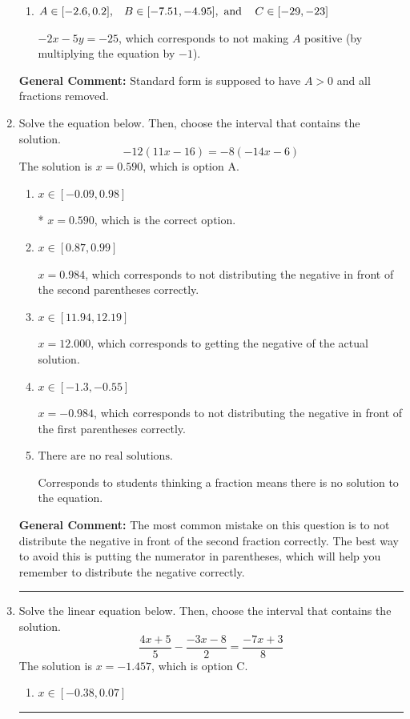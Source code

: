 \documentclass{extbook}[14pt]
\newcommand{\litem}[1]{\item #1

\rule{\textwidth}{0.4pt}}
\begin{document}
\begin{enumerate}
{\begin{enumerate}[label=\Alph*.]
* $2x + 5y = 25$, which is the correct option.
\item \( A \in [-2.6, 0.2], \hspace{3mm} B \in [-7.51, -4.95], \text{ and } \hspace{3mm} C \in [-29, -23] \)

 $-2x - 5y = -25$, which corresponds to not making $A$ positive (by multiplying the equation by $-1$).
\end{enumerate}

\textbf{General Comment:} Standard form is supposed to have $A > 0$ and all fractions removed.
}
\litem{
Solve the equation below. Then, choose the interval that contains the solution.
\[ -12(11x -16) = -8(-14x -6) \]The solution is \( x = 0.590 \), which is option A.\begin{enumerate}[label=\Alph*.]
\item \( x \in [-0.09, 0.98] \)

* $x = 0.590$, which is the correct option.
\item \( x \in [0.87, 0.99] \)

$x = 0.984$, which corresponds to not distributing the negative in front of the second parentheses correctly.
\item \( x \in [11.94, 12.19] \)

$x = 12.000$, which corresponds to getting the negative of the actual solution.
\item \( x \in [-1.3, -0.55] \)

$x = -0.984$, which corresponds to not distributing the negative in front of the first parentheses correctly.
\item \( \text{There are no real solutions.} \)

Corresponds to students thinking a fraction means there is no solution to the equation.
\end{enumerate}

\textbf{General Comment:} The most common mistake on this question is to not distribute the negative in front of the second fraction correctly. The best way to avoid this is putting the numerator in parentheses, which will help you remember to distribute the negative correctly.
}
\litem{
Solve the linear equation below. Then, choose the interval that contains the solution.
\[ \frac{4x + 5}{5} - \frac{-3x -8}{2} = \frac{-7x + 3}{8} \]The solution is \( x = -1.457 \), which is option C.\begin{enumerate}[label=\Alph*.]
\item \( x \in [-0.38, 0.07] \)


\end{enumerate}}
\end{enumerate}
\end{document}
